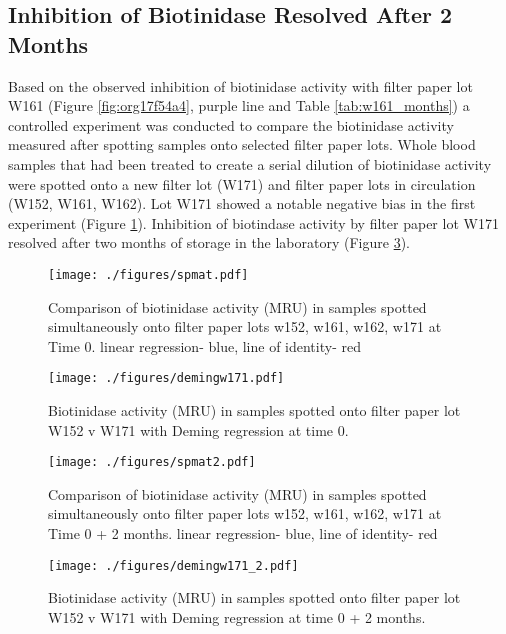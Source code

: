 \documentclass[review]{elsarticle}
\begin{document}
\subsection*{Inhibition of Biotinidase Resolved After 2 Months}
\label{sec:orgbeb2b18}
Based on the observed inhibition of biotinidase activity with filter
paper lot W161 (Figure \ref{fig:org17f54a4}, purple line and Table
\ref{tab:w161_months}) a controlled experiment was conducted to
compare the biotinidase activity measured after spotting samples onto
selected filter paper lots. Whole blood samples that had been treated
to create a serial dilution of biotinidase activity were spotted onto
a new filter lot (W171) and filter paper lots in circulation (W152,
W161, W162). Lot W171 showed a notable negative bias in the first experiment (Figure
\ref{fig:org6be01a1}). Inhibition of biotindase activity by filter paper lot W171
resolved after two months of storage in the laboratory (Figure
\ref{fig:orgf175053}).

\begin{figure}[htbp]
\centering
\texttt{[image: ./figures/spmat.pdf]}
\caption{\label{fig:org6be01a1}Comparison of biotinidase activity (MRU) in samples spotted simultaneously onto filter paper lots w152, w161, w162, w171 at Time 0. linear regression- blue, line of identity- red}
\end{figure}

\begin{figure}[htbp]
\centering
\texttt{[image: ./figures/demingw171.pdf]}
\caption{\label{fig:orgbe07013}Biotinidase activity (MRU) in samples spotted onto filter paper lot W152 v W171 with Deming regression at time 0.}
\end{figure}
\clearpage

\begin{figure}[htbp]
\centering
\texttt{[image: ./figures/spmat2.pdf]}
\caption{\label{fig:orgf175053}Comparison of biotinidase activity (MRU) in samples spotted simultaneously onto filter paper lots w152, w161, w162, w171 at Time 0 + 2 months. linear regression- blue, line of identity- red}
\end{figure}

\begin{figure}[htbp]
\centering
\texttt{[image: ./figures/demingw171\_2.pdf]}
\caption{\label{fig:org1825796}Biotinidase activity (MRU) in samples spotted onto filter paper lot W152 v W171 with Deming regression at time 0 + 2 months.}
\end{figure}
\end{document}

